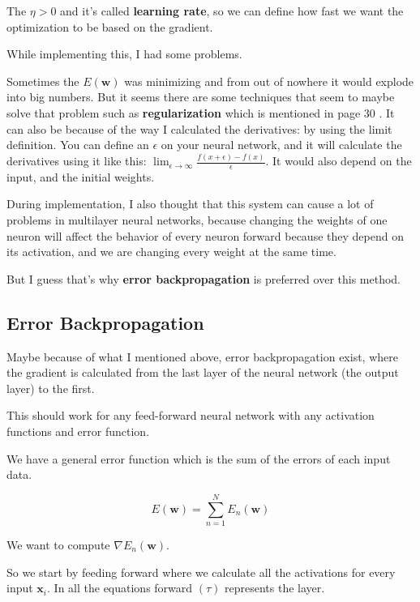 \documentclass[a4paper,12pt]{article}
\theoremstyle{mytheoremstyle}
\theoremstyle{mytheoremstyle}
\theoremstyle{myproblemstyle}
\begin{document}
    The $ \eta > 0 $ and it's called \textbf{learning rate}, so we can define
    how fast we want the optimization to be based on the gradient.

    While implementing this, I had some problems.

    Sometimes the $ E \left( \mathbf{w} \right) $ was minimizing and from out of nowhere it
    would explode into big numbers. But it seems there are some techniques that
    seem to maybe solve that problem such as \textbf{regularization} which is
    mentioned in page 30 \cite{bishop}. It can also be because of the way I
    calculated the derivatives: by using the limit definition. You can define
    an $ \epsilon $ on your neural network, and it will calculate the
    derivatives using it like this: $ \lim_{\epsilon\to\infty} \frac{f(x +
    \epsilon) - f(x)}{\epsilon} $. It would also depend on the input, and the
    initial weights.

    During implementation, I also thought that this system can cause a lot of
    problems in multilayer neural networks, because changing the weights of one
    neuron will affect the behavior of every neuron forward because they depend
    on its activation, and we are changing every weight at the same time.

    But I guess that's why \textbf{error backpropagation} is preferred over
    this method.

    \subsection{Error Backpropagation}

    Maybe because of what I mentioned above, error backpropagation exist, where
    the gradient is calculated from the last layer of the neural network (the
    output layer) to the first.

    This should work for any feed-forward neural network with any activation
    functions and error function.

    We have a general error function which is the sum of the errors of each
    input data.

    \begin{equation}
        E \left( \mathbf{w} \right) = \displaystyle\sum_{n=1}^{N} E_{n}(\mathbf{w})
    \end{equation}

    We want to compute $ \nabla E_{n} \left( \mathbf{w} \right) $.

    So we start by feeding forward where we calculate all the activations for
    every input $ \mathbf{x}_{i} $. In all the equations forward $ \left( \tau
    \right) $ represents the layer.
\end{document}
